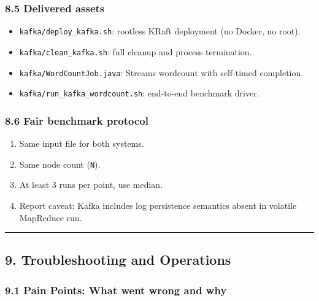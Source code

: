 \documentclass[
]{article}
\providecommand{\tightlist}{%
  \setlength{\itemsep}{0pt}\setlength{\parskip}{0pt}}
\begin{document}
\subsubsection{8.5 Delivered assets}\label{delivered-assets}

\begin{itemize}
\tightlist
\item
  \texttt{kafka/deploy\_kafka.sh}: rootless KRaft deployment (no Docker,
  no root).
\item
  \texttt{kafka/clean\_kafka.sh}: full cleanup and process termination.
\item
  \texttt{kafka/WordCountJob.java}: Streams wordcount with self-timed
  completion.
\item
  \texttt{kafka/run\_kafka\_wordcount.sh}: end-to-end benchmark driver.
\end{itemize}

\subsubsection{8.6 Fair benchmark protocol}\label{fair-benchmark-protocol}

\begin{enumerate}
\def\labelenumi{\arabic{enumi}.}
\tightlist
\item
  Same input file for both systems.
\item
  Same node count (\texttt{N}).
\item
  At least 3 runs per point, use median.
\item
  Report caveat: Kafka includes log persistence semantics absent in
  volatile MapReduce run.
\end{enumerate}

\begin{center}\rule{0.5\linewidth}{0.5pt}\end{center}

\subsection{9. Troubleshooting and
Operations}\label{troubleshooting-and-operations}

\subsubsection{9.1 Pain Points: What went wrong and
why}\label{pain-points-what-went-wrong-and-why}
\end{document}
